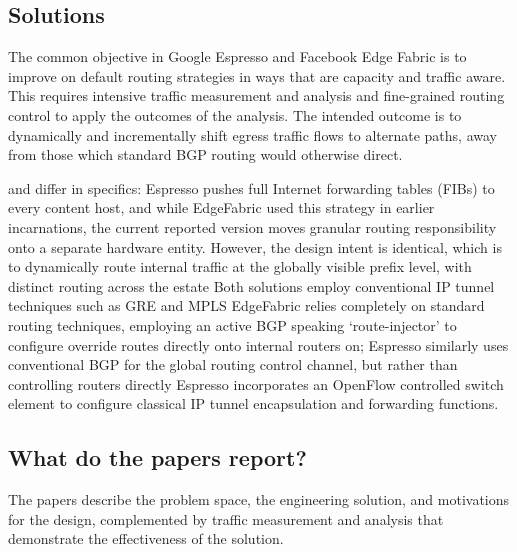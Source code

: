 \subsection{Solutions}
The common objective in Google Espresso and Facebook Edge Fabric is to improve on default routing strategies in ways that are capacity and traffic aware.
This requires intensive traffic measurement and analysis and fine-grained routing control to apply the outcomes of the analysis.
The intended outcome is to dynamically and incrementally shift egress traffic flows to alternate paths, away from those which standard BGP routing would otherwise direct.

\cite{Yap2017} and \cite{Schlinker2017} differ in specifics: Espresso pushes full Internet forwarding tables (FIBs) to every content host, and while EdgeFabric used this strategy in earlier incarnations, the current reported version moves granular routing responsibility onto a separate hardware entity.
However, the design intent is identical, which is to dynamically route internal traffic at the globally visible prefix level, with distinct routing across the estate
Both solutions employ conventional IP tunnel techniques such as GRE and MPLS
EdgeFabric relies completely on standard routing techniques, employing an active BGP speaking `route-injector' to configure override routes directly onto internal routers on; Espresso similarly uses conventional BGP for the global routing control channel, but rather than controlling routers directly Espresso incorporates an OpenFlow controlled switch element to configure classical IP tunnel encapsulation and forwarding functions.
\subsection{What do the papers report?}
The papers describe the problem space, the engineering solution, and motivations for the design, complemented by traffic measurement and analysis that demonstrate the effectiveness of the solution.

